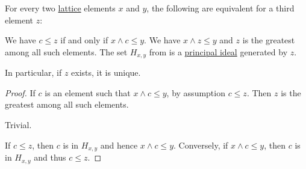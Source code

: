 \begin{proposition}\label{thm:heyting_conditional_set}
  For every two \hyperref[def:lattice]{lattice} elements \( x \) and \( y \), the following are equivalent for a third element \( z \):
  \begin{thmenum}
     We have \( c \leq z \) if and only if \( x \wedge c \leq y \).
     We have \( x \wedge z \leq y \) and \( z \) is the greatest among all such elements.
     The set \( H_{x,y} \) from  is a \hyperref[def:lattice_ideal/principal]{principal ideal} generated by \( z \).
  \end{thmenum}
\end{proposition}
\begin{comments}
  \item In particular, if \( z \) exists, it is unique.
\end{comments}
\begin{proof}
   If \( c \) is an element such that \( x \wedge c \leq y \), by assumption \( c \leq z \). Then \( z \) is the greatest among all such elements.

   Trivial.

   If \( c \leq z \), then \( c \) is in \( H_{x,y} \) and hence \( x \wedge c \leq y \). Conversely, if \( x \wedge c \leq y \), then \( c \) is in \( H_{x,y} \) and thus \( c \leq z \).
\end{proof}

